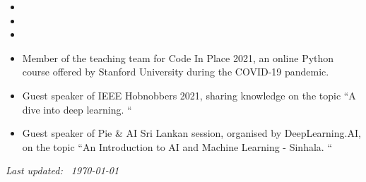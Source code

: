 \documentclass[10pt,a4paper,ragged2e,withhyper]{altacv}
\begin{document}
\medskip


\begin{itemize}
    \item {}
    \item {}
    \item {}
\end{itemize}

\medskip

\begin{itemize}
    \item Member of the teaching team for Code In Place 2021, an online Python course offered by Stanford University during the COVID-19 pandemic. 
    \item Guest speaker of IEEE Hobnobbers 2021, sharing knowledge on the topic ``A dive into deep learning. ``
    \item Guest speaker of Pie \& AI Sri Lankan session, organised by DeepLearning.AI, on the topic ``An Introduction to AI and Machine Learning - Sinhala. ``
\end{itemize}

\medskip



\vfill
\begin{flushright}
\flushright
\footnotesize{\emph{Last updated: ~\today }}
\end{flushright}
\end{document}
